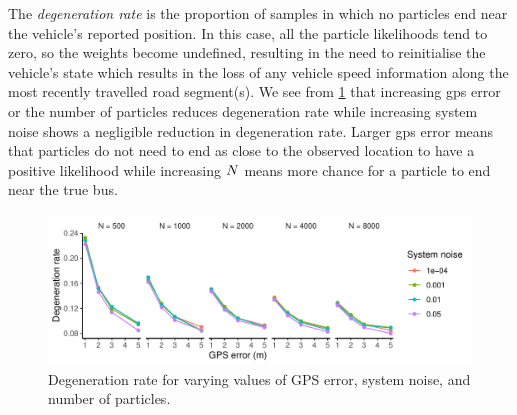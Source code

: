 The \emph{degeneration rate} is the proportion of samples in which no particles end near the vehicle's reported position. In this case, all the particle likelihoods tend to zero, so the weights become undefined, resulting in the need to reinitialise the vehicle's state which results in the loss of any vehicle speed information along the most recently travelled road segment(s). We see from \cref{fig:model_performance_degen} that increasing \gls{gps} error or the number of particles reduces degeneration rate while increasing system noise shows a negligible reduction in degeneration rate. Larger \gls{gps} error means that particles do not need to end as close to the observed location to have a positive likelihood while increasing $N$ means more chance for a particle to end near the true bus.

\begin{knitrout}\small
{}\color{fgcolor}\begin{figure}

{\centering \includegraphics[width=\textwidth]{figure/model_performance_degen-1} 

}

\caption[Degeneration rate for varying values of GPS error, system noise, and number of particles]{Degeneration rate for varying values of GPS error, system noise, and number of particles.}\label{fig:model_performance_degen}
\end{figure}


\end{knitrout}

